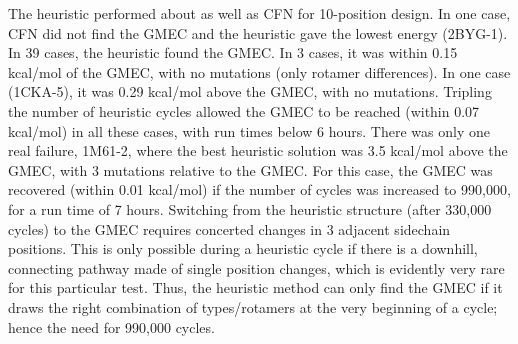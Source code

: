 {{The heuristic performed about as well as CFN for 10-position design. In one case, CFN did not find the GMEC and
the heuristic gave the lowest energy (2BYG-1). In 39 cases, the heuristic found the GMEC. In 3 cases, it was within
0.15 kcal/mol of the GMEC, with no mutations (only rotamer differences). In one case (1CKA-5), it was 0.29 kcal/mol
above the GMEC, with no mutations. Tripling the number of heuristic cycles allowed the GMEC to be reached (within
0.07 kcal/mol) in all these cases, with run times below 6 hours. There was only one real failure, 1M61-2, where
the best heuristic solution was 3.5 kcal/mol above the GMEC, with 3 mutations relative to the GMEC. For this case,
the GMEC was recovered (within 0.01 kcal/mol) if the number of cycles was increased to 990,000, for a run time of 7
hours. Switching from the heuristic structure (after 330,000 cycles) to the GMEC requires concerted changes in 3
adjacent sidechain positions. This is only possible during a heuristic cycle if there is a downhill, connecting pathway
made of single position changes, which is evidently very rare for this particular test. Thus, the heuristic method
can only find the GMEC if it draws the right combination of types/rotamers at the very beginning of a cycle; hence
the need for 990,000 cycles.

}}
